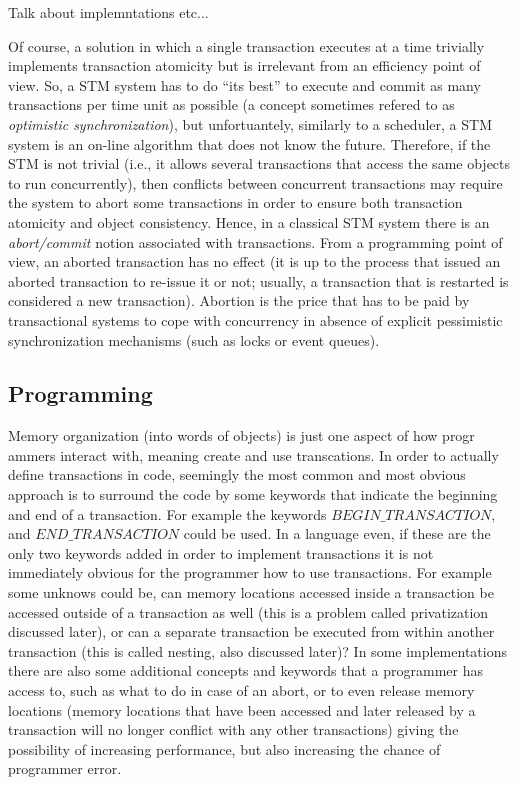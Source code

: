 Talk about implemntations etc...

Of course, a solution in which a single transaction  executes at a time
trivially implements transaction atomicity but is irrelevant from 
an efficiency point of view. So, a STM system has to do ``its best'' to 
execute and commit as many transactions  per time unit as possible
(a concept sometimes refered to as \emph{optimistic synchronization}), 
but unfortuantely, similarly to 
a scheduler, a STM system is an on-line algorithm that does not know 
the future. Therefore, if the STM is not trivial (i.e., it allows several transactions 
that access the same objects to run concurrently),  
then conflicts between concurrent transactions may require the system to abort some transactions in order 
to ensure both transaction  atomicity and object consistency.
Hence,  in  a
classical  STM system    there    is  an    {\it   abort/commit}    notion
associated   with transactions. 
From a programming point of view, an aborted transaction has no effect (it is 
up to the process that issued an aborted transaction to re-issue it or not; 
usually, a transaction that is restarted is considered  a new transaction). 
Abortion is   the price that has to  be paid by transactional  systems to cope 
with concurrency in  absence of explicit pessimistic synchronization mechanisms
(such as locks or event queues).




\subsection{Programming}
Memory organization (into words of objects) is just one aspect of how progr
ammers interact with, meaning create and use transcations.
In order to actually define transactions in code, seemingly the most common
 and most obvious approach is to surround the code by some keywords that indicate the beginning and end of a transaction.
For example the keywords $BEGIN\_TRANSACTION$, and $END\_TRANSACTION$ could
 be used.
In a language even, if these are the only two keywords added in order to implement
 transactions it is not immediately obvious for the programmer how to use transactions.
For example some unknows could be, can memory locations accessed inside a 
transaction be accessed outside of a transaction as well (this is a problem 
called privatization discussed later), or can a separate transaction be executed
 from within another transaction (this is called nesting, also discussed later)?
In some implementations there are also some additional concepts and keywords 
that a programmer has access to, such as what to do in case of an abort, or to
 even release memory locations (memory locations that have been accessed and later
 released by a transaction will no longer conflict with any other transactions) giving
 the possibility of increasing performance, but also increasing the chance of programmer error.


